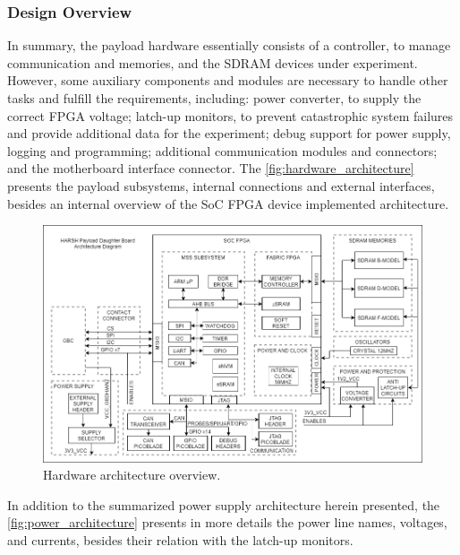 
\subsubsection{Design Overview}

In summary, the payload hardware essentially consists of a controller, to manage communication and memories, and the SDRAM devices under experiment. However, some auxiliary components and modules are necessary to handle other tasks and fulfill the requirements, including: power converter, to supply the correct FPGA voltage; latch-up monitors, to prevent catastrophic system failures and provide additional data for the experiment; debug support for power supply, logging and programming; additional communication modules and connectors; and the motherboard interface connector. The \autoref{fig:hardware_architecture} presents the payload subsystems, internal connections and external interfaces, besides an internal overview of the SoC FPGA device implemented architecture.

\begin{figure}[!ht]
    \begin{center}
        \includegraphics[width=\textwidth]{figures/hardware_architecture.png}
        \caption{Hardware architecture overview.}
        \label{fig:hardware_architecture}
    \end{center}
\end{figure}


In addition to the summarized power supply architecture herein presented, the \autoref{fig:power_architecture} presents in more details the power line names, voltages, and currents, besides their relation with the latch-up monitors.

